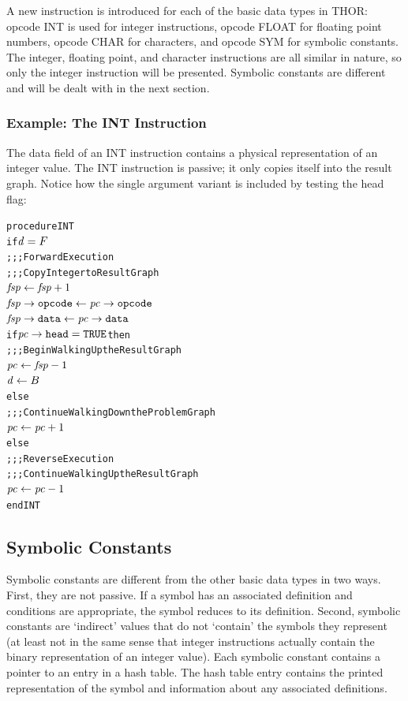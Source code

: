 A new instruction is introduced for each of the basic data types in THOR: opcode INT is
used for integer instructions, opcode FLOAT for floating point numbers, opcode CHAR for
characters, and opcode SYM for symbolic constants. The integer, floating point, and
character instructions are all similar in nature, so only the integer instruction will be
presented. Symbolic constants are different and will be dealt with in the next section.

\subsubsection*{Example: The INT Instruction}

The data field of an INT instruction contains a physical representation of an integer
value. The INT instruction is passive; it only copies itself into the result graph.
Notice how the single argument variant is included by testing the head flag:

\par\smallskip\noindent\begin{minipage}{\linewidth}
\begin{alltt}
procedure INT
  if \(\rt{d} = F\)
    \textrm{;;; Forward Execution}
    \textrm{;;; Copy Integer to Result Graph}
    \(\rt{fsp} \leftarrow \rt{fsp}+1\)
    \(\rtfield{fsp}{opcode} \leftarrow \rtfield{pc}{opcode}\)
    \(\rtfield{fsp}{data} \leftarrow \rtfield{pc}{data}\)
    if \(\rtfield{pc}{head} = \mathtt{TRUE}\) then
      \textrm{;;; Begin Walking Up the Result Graph}
      \(\rt{pc} \leftarrow \rt{fsp}-1\)
      \(\rt{d} \leftarrow B\)
    else
      \textrm{;;; Continue Walking Down the Problem Graph}
      \(\rt{pc} \leftarrow \rt{pc}+1\)
  else
    \textrm{;;; Reverse Execution}
    \textrm{;;; Continue Walking Up the Result Graph}
    \(\rt{pc} \leftarrow \rt{pc}-1\)
end INT
\end{alltt}
\end{minipage}\par\smallskip


\subsection{Symbolic Constants}

Symbolic constants are different from the other basic data types in two ways. First, they
are not passive. If a symbol has an associated definition and conditions are appropriate,
the symbol reduces to its definition. Second, symbolic constants are `indirect' values that
do not `contain' the symbols they represent (at least not in the same sense that integer
instructions actually contain the binary representation of an integer value). Each symbolic
constant contains a pointer to an entry in a hash table. The hash table entry contains the
printed representation of the symbol and information about any associated definitions.


